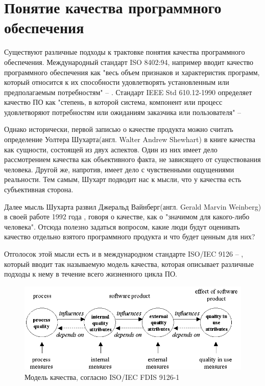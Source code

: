 \section{Понятие качества программного обеспечения}

Существуют различные подходы к трактовке понятия качества программного обеспечения. Международный стандарт ISO 8402:94, например вводит качество программного обеспечения как "весь объем признаков и характеристик программ, который относится к их способности удовлетворять установленным или предполагаемым потребностям"  -- \cite{ISO840294}. Стандарт IEEE Std 610.12-1990 определяет качество ПО как "степень, в которой система, компонент или процесс удовлетворяют потребностям или ожиданиям заказчика или пользователя" -- \cite{1990ieee}

Однако исторически, первой записью о качестве продукта можно считать определение Уолтера Шухарта(англ. Walter Andrew Shewhart) в книге \cite{shewhart1931economic} качества как сущности, состоящей из двух аспектов. Один из них имеет дело рассмотрением качества как объективного факта, не зависящего от существования человека. Другой же, напротив, имеет дело с чувственными ощущениями реальности. Тем самым, Шухарт подводит нас к мысли, что у качества есть субъективная сторона.

Далее мысль Шухарта развил Джеральд Вайнберг(англ. Gerald Marvin Weinberg) в своей работе 1992 года \cite{weinberg1993quality}, говоря о качестве, как о "значимом для какого-либо человека". Отсюда полезно задаться вопросом, какие люди будут оценивать качество отдельно взятого программного продукта и что будет ценным для них?

Отголосок этой мысли есть и в международном стандарте ISO/IEC 9126 -- \cite{ISOIEC9126}, который вводит так называемую модель качества, которая описывает различные подходы к нему в течение всего жизненного цикла ПО.

\begin{figure}[H]
  \centering
  \includegraphics[width=\textwidth]{img/quality_framework.png}
  \caption{Модель качества, согласно ISO/IEC FDIS 9126-1}
\end{figure}

